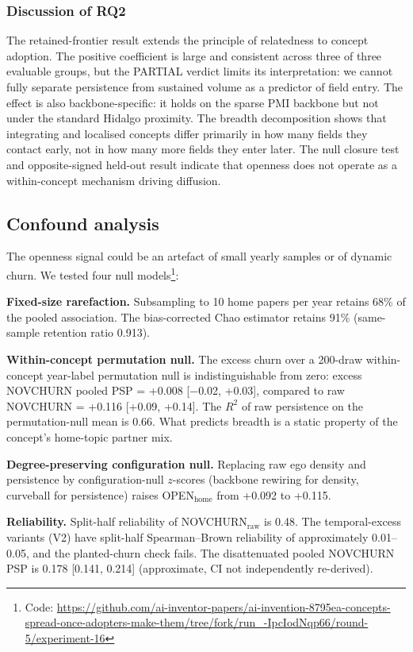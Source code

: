 \documentclass[11pt,letterpaper]{article}
\begin{document}
\subsubsection{Discussion of RQ2}

The retained-frontier result extends the principle of relatedness to concept adoption. The positive coefficient is large and consistent across three of three evaluable groups, but the PARTIAL verdict limits its interpretation: we cannot fully separate persistence from sustained volume as a predictor of field entry. The effect is also backbone-specific: it holds on the sparse PMI backbone but not under the standard Hidalgo proximity. The breadth decomposition shows that integrating and localised concepts differ primarily in how many fields they contact early, not in how many more fields they enter later. The null closure test and opposite-signed held-out result indicate that openness does not operate as a within-concept mechanism driving diffusion.


\subsection{Confound analysis}
\label{sec:confound}

The openness signal could be an artefact of small yearly samples or of dynamic churn. We tested four null models\footnote{Code: \url{https://github.com/ai-inventor-papers/ai-invention-8795ea-concepts-spread-once-adopters-make-them/tree/fork/run_-IpcIodNqp66/round-5/experiment-16}}:

\textbf{Fixed-size rarefaction.} Subsampling to 10 home papers per year retains 68\% of the pooled association. The bias-corrected Chao estimator retains 91\% (same-sample retention ratio 0.913).

\textbf{Within-concept permutation null.} The excess churn over a 200-draw within-concept year-label permutation null is indistinguishable from zero: excess NOVCHURN pooled PSP = +0.008 [$-$0.02, +0.03], compared to raw NOVCHURN = +0.116 [+0.09, +0.14]. The $R^2$ of raw persistence on the permutation-null mean is 0.66. What predicts breadth is a static property of the concept's home-topic partner mix.

\textbf{Degree-preserving configuration null.} Replacing raw ego density and persistence by configuration-null $z$-scores (backbone rewiring for density, curveball for persistence) raises OPEN$_{\text{home}}$ from +0.092 to +0.115.

\textbf{Reliability.} Split-half reliability of NOVCHURN$_{\text{raw}}$ is 0.48. The temporal-excess variants (V2) have split-half Spearman--Brown reliability of approximately 0.01--0.05, and the planted-churn check fails. The disattenuated pooled NOVCHURN PSP is 0.178 [0.141, 0.214] (approximate, CI not independently re-derived).
\end{document}
